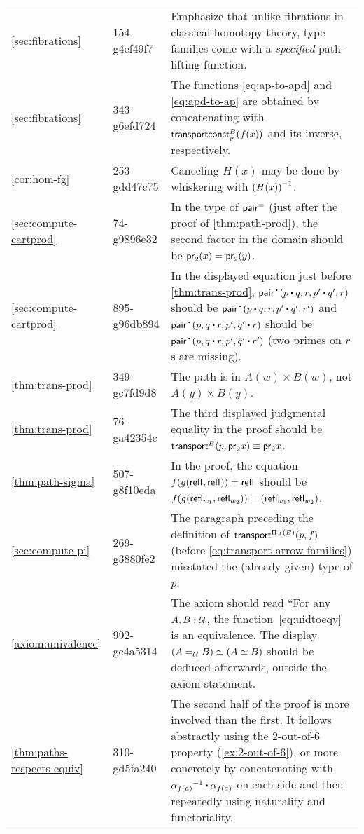 \documentclass[
%
%
11pt %
]{article}
\begin{document}
\begin{longtable}{llp{10.5cm}}
  \cref{sec:fibrations}
  & 154-g4ef49f7
  & Emphasize that unlike fibrations in classical homotopy theory, type families come with a \emph{specified} path-lifting function.\\
  \cref{sec:fibrations}
  & 343-g6efd724
  & The functions \cref{eq:ap-to-apd} and \cref{eq:apd-to-ap} are obtained by concatenating with $\transconst Bp{f(x)}$ and its inverse, respectively.\\
  \cref{cor:hom-fg}
  & 253-gdd47c75
  & Canceling $H(x)$ may be done by whiskering with $\opp{(H(x))}$.\\
  \cref{sec:compute-cartprod}
  & 74-g9896e32
  & In the type of $\pairpath$ (just after the proof of \cref{thm:path-prod}), the second factor in the domain should be $\id{\proj{2}(x)}{\proj{2}(y)}$.\\
  \cref{sec:compute-cartprod}
  & 895-g96db894
  & In the displayed equation just before \cref{thm:trans-prod}, $\pairct(p\ct q, r, p'\ct q', r)$ should be $\pairct(p\ct q, r, p'\ct q', r')$ and $\pairct(p, q\ct r, p', q'\ct r)$ should be $\pairct(p, q\ct r, p', q'\ct r')$ (two primes on $r$s are missing).\\
  \cref{thm:trans-prod}
  & 349-gc7fd9d8
  & The path is in $A(w)\times B(w)$, not $A(y)\times B(y)$.\\
  \cref{thm:trans-prod}
  & 76-ga42354c
  & The third displayed judgmental equality in the proof should be $\transfib{B}{p}{\proj{2}x} \jdeq \proj2x$.\\
  \cref{thm:path-sigma}
  & 507-g8f10eda
  & In the proof, the equation $f(g(\refl{},\refl{}))=\refl{}$ should be $f (g(\refl{w_1},\refl{w_2})) = (\refl{w_1},\refl{w_2})$.\\
  \cref{sec:compute-pi}
  & 269-g3880fe2
  & The paragraph preceding the definition of $\transfib{\Pi_A(B)}{p}{f}$ (before \cref{eq:transport-arrow-families}) misstated the (already given) type of $p$.\\
  \cref{axiom:univalence}
  & 992-gc4a5314
  & The axiom should read ``For any $A,B:\type$, the function~\eqref{eq:uidtoeqv} is an equivalence.  The display $\eqv{(\id[\type]{A}{B})}{(\eqv A B)}$ should be deduced afterwards, outside the axiom statement.\\
  \cref{thm:paths-respects-equiv}
  & 310-gd5fa240
  & The second half of the proof is more involved than the first.
  It follows abstractly using the 2-out-of-6 property (\cref{ex:2-out-of-6}), or more concretely by concatenating with $\opp{\alpha_{f(a)}} \ct {\alpha_{f(a)}}$ on each side and then repeatedly using naturality and functoriality.\\

\end{longtable}
\end{document}
